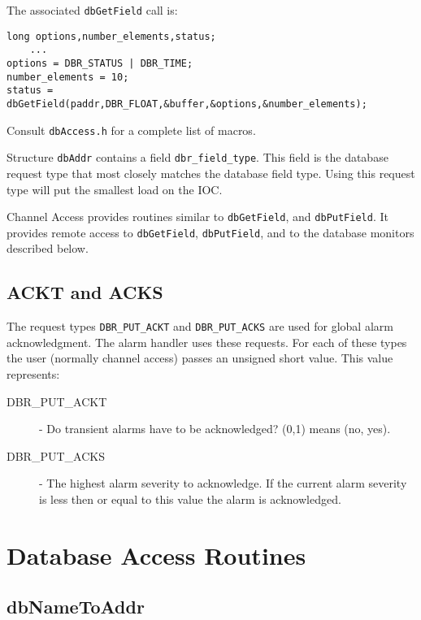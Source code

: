 The associated \verb|dbGetField| call is:

\begin{verbatim}
long options,number_elements,status;
    ...
options = DBR_STATUS | DBR_TIME;
number_elements = 10;
status = dbGetField(paddr,DBR_FLOAT,&buffer,&options,&number_elements);
\end{verbatim}

Consult \verb|dbAccess.h| for a complete list of macros.

Structure \verb|dbAddr| contains a field \verb|dbr_field_type|. This field is the database request type that most closely matches 
the database field type. Using this request type will put the smallest load on the IOC.

Channel Access provides routines similar to \verb|dbGetField|, and \verb|dbPutField|. It provides remote access to 
\verb|dbGetField|, \verb|dbPutField|, and to the database monitors described below.

\subsection{ACKT and ACKS}

The request types \verb|DBR_PUT_ACKT| and \verb|DBR_PUT_ACKS| are used for global alarm acknowledgment. The alarm handler 
uses these requests. For each of these types the user (normally channel access) passes an unsigned short value. This value 
represents:

\begin{description}

\item[DBR\_PUT\_ACKT]  - Do transient alarms have to be acknowledged? (0,1) means (no, yes).

\item[DBR\_PUT\_ACKS] - The highest alarm severity to acknowledge. If the current alarm severity is less then or equal to this 
value the alarm is acknowledged.

\end{description}

\section{Database Access Routines}

\subsection{dbNameToAddr}

